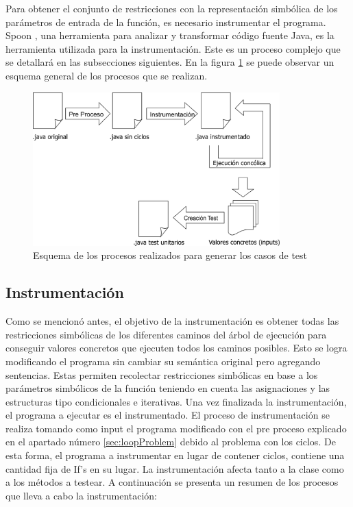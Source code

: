 \documentclass{llncs}
\begin{document}
Para obtener el conjunto de restricciones con la representación simbólica de los parámetros de entrada de la función, es necesario instrumentar el programa.
Spoon \cite{spoon}, una herramienta para analizar y transformar código fuente Java, es la herramienta utilizada para la instrumentación.
Este es un proceso complejo que se detallará en las subsecciones siguientes.
En la figura \ref{fig:procesosRealizados} se puede observar un esquema general de los procesos que se realizan.

\begin{figure}
\centering
\includegraphics[width=0.85\textwidth]{procesosRealizados}
\caption{Esquema de los procesos realizados para generar los casos de test}
\label{fig:procesosRealizados}
\end{figure}

\subsection{Instrumentación}
Como se mencionó antes, el objetivo de la instrumentación es obtener todas las restricciones simbólicas de los diferentes caminos del árbol de
ejecución para conseguir valores concretos que ejecuten todos los caminos posibles. Esto se logra modificando el programa sin cambiar su semántica original
pero agregando sentencias. Estas permiten recolectar restricciones simbólicas en base a los parámetros simbólicos de la función teniendo en cuenta las asignaciones
y las estructuras tipo condicionales e iterativas. Una vez finalizada la instrumentación, el programa a ejecutar es el instrumentado.
El proceso de instrumentación se realiza tomando como input el programa modificado con el pre proceso explicado en el apartado número \ref{sec:loopProblem}
debido al problema con los ciclos. De esta forma, el programa a instrumentar en lugar de contener ciclos, contiene una cantidad fija de If’s en su lugar.
La instrumentación afecta tanto a la clase como a los métodos a testear. A continuación se presenta un resumen de los procesos que lleva a cabo la instrumentación:
\end{document}
